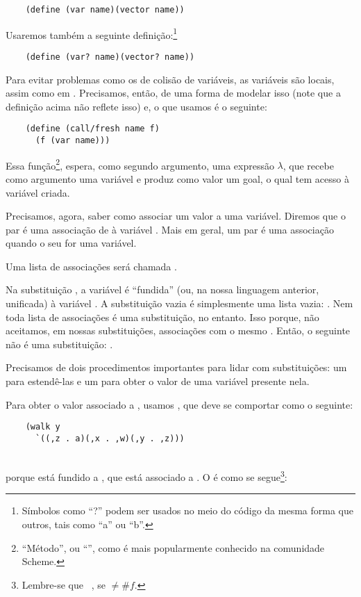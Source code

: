 \documentclass{article}
\begin{document}
  \begin{lstlisting}
    (define (var name)(vector name))
  \end{lstlisting}

  \noindent Usaremos também a seguinte definição:\footnote{Símbolos como ``?'' podem ser
    usados no meio do código da mesma forma que outros, tais como ``a'' ou ``b''.}

  \begin{lstlisting}
    (define (var? name)(vector? name))
  \end{lstlisting}

  Para evitar problemas como os de colisão de variáveis, as variáveis
  são locais, assim como em . Precisamos, então, de
  uma forma de modelar isso (note que a definição acima não reflete
  isso) e, o que usamos é o seguinte:

  \begin{lstlisting}
    (define (call/fresh name f)
      (f (var name)))
  \end{lstlisting}

  Essa função\footnote{``Método'', ou ``'', como é
    mais popularmente conhecido na comunidade Scheme.},  espera, como
  segundo argumento, uma expressão $\lambda$, que
  recebe como argumento uma variável e produz como valor um goal, o qual
  tem acesso à variável criada.
  
  Precisamos, agora, saber como associar um valor a uma
  variável. Diremos que o par  é uma associação de
   à variável . Mais em geral, um par é uma
  associação quando o seu  for uma variável.

  Uma lista de associações será chamada .

  Na substituição , a variável  é
  ``fundida'' (ou, na nossa linguagem anterior, unificada) à variável
  . A substituição vazia é simplesmente uma lista vazia:
  . Nem toda lista de associações é uma
  substituição, no entanto. Isso porque, não aceitamos, em nossas
  substituições, associações com o mesmo . Então, o
  seguinte não é uma substituição: .

  Precisamos de dois procedimentos importantes para lidar com
  substituições: um para estendê-las e um para obter o valor de uma
  variável presente nela.

  Para obter o valor associado a , usamos ,
  que deve se comportar como o seguinte:
  \begin{lstlisting}
    (walk y
      `((,z . a)(,x . ,w)(,y . ,z)))
  \end{lstlisting}
  \hspace{1cm} \seta\ \\
  porque  está fundido a , que está associado
  a . O  é como se
  segue\footnote{Lembre-se que  \seta\ ,
    se  $\neq \#f$.}:
\end{document}
